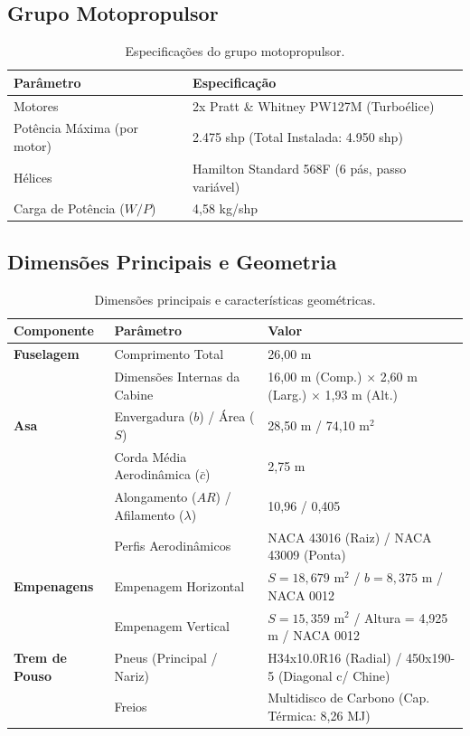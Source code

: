 \subsection{Grupo Motopropulsor}
\begin{table}[htbp]
\centering
\small
\begin{tabularx}{\textwidth}{lX}
\toprule
\textbf{Parâmetro} & \textbf{Especificação} \\
\midrule
Motores & 2x Pratt \& Whitney PW127M (Turboélice) \\
Potência Máxima (por motor) & 2.475 shp (Total Instalada: 4.950 shp) \\
Hélices & Hamilton Standard 568F (6 pás, passo variável) \\
Carga de Potência ($W/P$) & 4,58 kg/shp \\
\bottomrule
\end{tabularx}
\caption{Especificações do grupo motopropulsor.}
\label{tab:propulsao}
\end{table}

\clearpage

\subsection{Dimensões Principais e Geometria}
\begin{table}[htbp]
\centering
\small
\begin{tabularx}{\textwidth}{llX}
\toprule
\textbf{Componente} & \textbf{Parâmetro} & \textbf{Valor} \\
\midrule
\textbf{Fuselagem} & Comprimento Total & 26,00 m \\
                   & Dimensões Internas da Cabine & 16,00 m (Comp.) $\times$ 2,60 m (Larg.) $\times$ 1,93 m (Alt.) \\
\midrule
\textbf{Asa}       & Envergadura ($b$) / Área ($S$) & 28,50 m / 74,10 m$^2$ \\
                   & Corda Média Aerodinâmica ($\bar{c}$) & 2,75 m \\
                   & Alongamento ($AR$) / Afilamento ($\lambda$) & 10,96 / 0,405 \\
                   & Perfis Aerodinâmicos & NACA 43016 (Raiz) / NACA 43009 (Ponta) \\
\midrule
\textbf{Empenagens} & Empenagem Horizontal & $S = 18,679$ m$^2$ / $b = 8,375$ m / NACA 0012 \\
                   & Empenagem Vertical & $S = 15,359$ m$^2$ / Altura = 4,925 m / NACA 0012 \\
\midrule
\textbf{Trem de Pouso} & Pneus (Principal / Nariz) & H34x10.0R16 (Radial) / 450x190-5 (Diagonal c/ Chine) \\
                       & Freios & Multidisco de Carbono (Cap. Térmica: 8,26 MJ) \\
\bottomrule
\end{tabularx}
\caption{Dimensões principais e características geométricas.}
\label{tab:geometria}
\end{table}

